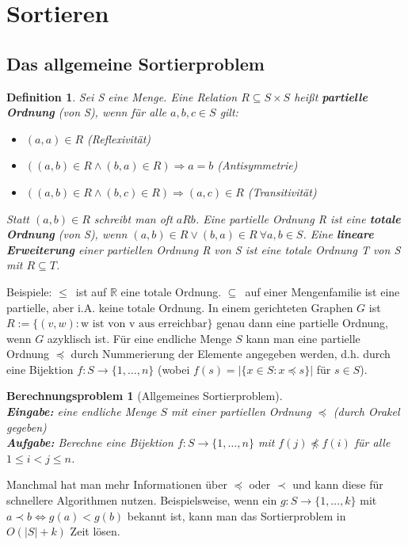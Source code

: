 \documentclass[12pt,a4paper]{article}
\theoremstyle{plain}
\newtheorem{Definition}[Theorem]{Definition}
\newtheorem{Berechnungsproblem}[Theorem]{Berechnungsproblem}
\newcommand{\herv}[1]{{\emph{\textbf{#1}}}}
\newcommand{\R}{\mathbb{R}}
\numberwithin{equation}{section}
\begin{document}
\section{Sortieren}
\subsection{Das allgemeine Sortierproblem}
\begin{Definition}
Sei S eine Menge. Eine Relation $R\subseteq S\times S$ heißt \herv{partielle Ordnung} (von S), wenn für alle $a,b,c\in S$ gilt:
\begin{itemize}
\item $(a,a)\in R$ (Reflexivität)
\item $\left( (a,b)\in R \wedge (b,a) \in R \right) \Rightarrow a=b$ (Antisymmetrie)
\item $\left( (a,b)\in R \wedge (b,c) \in R \right) \Rightarrow (a,c)\in R$ (Transitivität)
\end{itemize}
Statt $(a,b) \in R$ schreibt man oft $aRb$. Eine partielle Ordnung R ist eine \herv{totale Ordnung} (von S), wenn $(a,b)\in R \vee (b,a)\in R\ \forall a,b\in S$. Eine \herv{lineare Erweiterung} einer partiellen Ordnung R von S ist eine totale Ordnung T von S mit $R\subseteq T$.
\end{Definition}
Beispiele: \glqq$\leq$\grqq\ ist auf $\R$ eine totale Ordnung. \glqq$\subseteq$\grqq\ auf einer Mengenfamilie ist eine partielle, aber i.A. keine totale Ordnung. In einem gerichteten Graphen $G$ ist $R:=\{(v,w): \text{w ist von v aus erreichbar}\}$ genau dann eine partielle Ordnung, wenn $G$ azyklisch ist. Für eine endliche Menge $S$ kann man eine partielle Ordnung $\preceq$ durch Nummerierung der Elemente angegeben werden, d.h. durch eine Bijektion $f:S\rightarrow \{1,\ldots,n\}$ (wobei $f(s)=|\{x\in S: x\preceq s\}|$ für $s\in S$).
\begin{Berechnungsproblem}[Allgemeines Sortierproblem]\\
\textbf{Eingabe:} eine endliche Menge $S$ mit einer partiellen Ordnung $\preceq$ (durch Orakel gegeben)\\
\textbf{Aufgabe:} Berechne eine Bijektion $f: S \rightarrow \{1,\ldots,n\}$ mit $f(j)\not\preceq f(i)$ für alle $1\leq i < j \leq n$.
\end{Berechnungsproblem}
Manchmal hat man mehr Informationen über $\preceq$ oder $\prec$ und kann diese für schnellere Algorithmen nutzen. Beispielsweise, wenn ein $g: S \rightarrow \{1,\ldots, k\}$ mit $a\prec b \Leftrightarrow g(a) < g(b)$ bekannt ist, kann man das Sortierproblem in $O(|S|+k)$ Zeit lösen.
\end{document}
